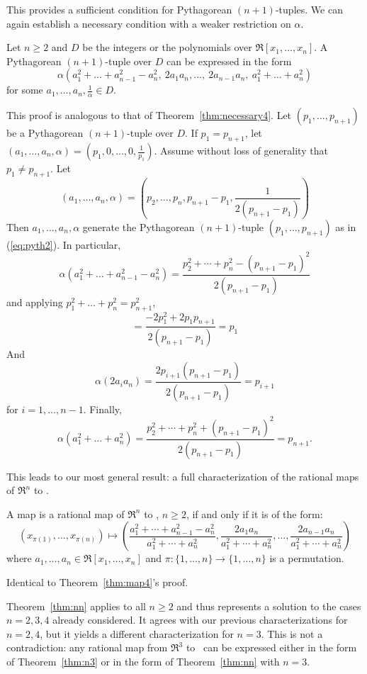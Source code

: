 This provides a sufficient condition for Pythagorean $(n+1)$-tuples.
We can again establish a necessary condition with a weaker restriction on
$\alpha$.

\begin{theorem}
\label{thm:necessaryn}
Let $n \geq 2$ and $D$ be the integers or the polynomials 
over $\Re[x_1,\ldots,x_n]$.
A Pythagorean $(n+1)$-tuple over $D$ can be expressed in the form
\begin{equation}
\label{eq:pyth2}
	\alpha (a_1^2 + \ldots + a_{n-1}^2 - a_n^2,
		\ 2a_1a_n,\ldots,\ 2a_{n-1}a_n,
		\ a_1^2 + \ldots + a_n^2)
\end{equation}
for some $a_1,\ldots,a_n,\frac{1}{\alpha} \in D$.
\end{theorem}
\prf
This proof is analogous to that of Theorem~\ref{thm:necessary4}.
Let $(p_1,\ldots,p_{n+1})$ be a Pythagorean $(n+1)$-tuple over $D$.
If $p_1 = p_{n+1}$, let 
$(a_1,\ldots,a_n,\alpha) = (p_1,0,\ldots,0,\frac{1}{p_1})$.
Assume without loss of generality that $p_1 \neq p_{n+1}$.
Let 
\[
(a_1,\ldots,a_n,\alpha) = (p_2,\ldots,p_n,p_{n+1}-p_1,
	\frac{1}{2(p_{n+1}-p_1)})
\]
Then $a_1,\ldots,a_n,\alpha$ generate the Pythagorean $(n+1)$-tuple
$(p_1,\ldots,p_{n+1})$ as in (\ref{eq:pyth2}).
In particular,
\[
\alpha (a_1^2 + \ldots + a_{n-1}^2 - a_n^2)
= \frac{p_2^2 + \cdots + p_n^2 - (p_{n+1}-p_1)^2}{2(p_{n+1}-p_1)}
\]
and applying $p_1^2 + \ldots + p_n^2 = p_{n+1}^2$,
\[
= \frac{-2p_1^2 + 2p_1p_{n+1}}{2(p_{n+1} - p_1)}
= p_1
\]
And
\[
\alpha (2a_i a_n) 
= \frac{2p_{i+1}(p_{n+1}-p_1)}{2(p_{n+1}-p_1)}
= p_{i+1}
\]
for $i=1,\ldots,n-1$.
Finally, 
\[ 
\alpha (a_1^2 + \ldots + a_n^2)
= \frac{p_2^2 + \cdots + p_n^2 + (p_{n+1}-p_1)^2}{2(p_{n+1}-p_1)}
= p_{n+1}.
\]
\QED

This leads to our most general result: 
a full characterization of the rational maps of $\Re^n$ to .

\begin{theorem}
\label{thm:nn}
A map is a rational map of $\Re^n$ to , $n \geq 2$, if and only if
it is of the form:
\[
	(x_{\pi(1)},\ldots,x_{\pi(n)}) \mapsto 
	(\frac{a_1^2 + \cdots + a_{n-1}^2 - a_n^2}{a_1^2 + \cdots + a_n^2},
	 \frac{2a_1a_n}{a_1^2 + \cdots + a_n^2},
	 \ldots,
	 \frac{2a_{n-1}a_n}{a_1^2 + \cdots + a_n^2})
\]
where $a_1,\ldots,a_n \in \Re[x_1,\ldots,x_n]$
and $\pi: \{1,\ldots,n\} \rightarrow \{1,\ldots,n\}$ is a permutation.
\end{theorem}
\prf
Identical to Theorem~\ref{thm:map4}'s proof.
\QED

Theorem~\ref{thm:nn} applies to all $n \geq 2$ and thus represents 
a solution to the cases $n=2,3,4$ already considered.
It agrees with our previous characterizations for $n=2,4$,
but it yields a different characterization for $n=3$.
This is not a contradiction: any rational map
from $\Re^3$ to \ can be expressed either in the form of 
Theorem~\ref{thm:n3} or in the form of Theorem~\ref{thm:nn} with $n=3$.


